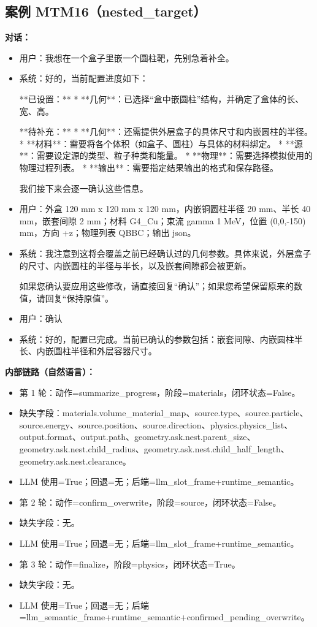 \documentclass[11pt]{ctexart}
\begin{document}
\subsection{案例 MTM16（nested\_target）}
\textbf{对话：}
\begin{itemize}
\item 用户：我想在一个盒子里嵌一个圆柱靶，先别急着补全。
\item 系统：好的，当前配置进度如下：

**已设置：**
*   **几何**：已选择“盒中嵌圆柱”结构，并确定了盒体的长、宽、高。

**待补充：**
*   **几何**：还需提供外层盒子的具体尺寸和内嵌圆柱的半径。
*   **材料**：需要将各个体积（如盒子、圆柱）与具体的材料绑定。
*   **源**：需要设定源的类型、粒子种类和能量。
*   **物理**：需要选择模拟使用的物理过程列表。
*   **输出**：需要指定结果输出的格式和保存路径。

我们接下来会逐一确认这些信息。
\item 用户：外盒 120 mm x 120 mm x 120 mm，内嵌铜圆柱半径 20 mm、半长 40 mm，嵌套间隙 2 mm；材料 G4\_Cu；束流 gamma 1 MeV，位置 (0,0,-150) mm，方向 +z；物理列表 QBBC；输出 json。
\item 系统：我注意到这将会覆盖之前已经确认过的几何参数。具体来说，外层盒子的尺寸、内嵌圆柱的半径与半长，以及嵌套间隙都会被更新。

如果您确认要应用这些修改，请直接回复“确认”；如果您希望保留原来的数值，请回复“保持原值”。
\item 用户：确认
\item 系统：好的，配置已完成。当前已确认的参数包括：嵌套间隙、内嵌圆柱半长、内嵌圆柱半径和外层容器尺寸。
\end{itemize}
\textbf{内部链路（自然语言）：}
\begin{itemize}
\item 第 1 轮：动作=summarize\_progress，阶段=materials，闭环状态=False。
\item 缺失字段：materials.volume\_material\_map、source.type、source.particle、source.energy、source.position、source.direction、physics.physics\_list、output.format、output.path、geometry.ask.nest.parent\_size、geometry.ask.nest.child\_radius、geometry.ask.nest.child\_half\_length、geometry.ask.nest.clearance。
\item LLM 使用=True；回退=无；后端=llm\_slot\_frame+runtime\_semantic。
\item 第 2 轮：动作=confirm\_overwrite，阶段=source，闭环状态=False。
\item 缺失字段：无。
\item LLM 使用=True；回退=无；后端=llm\_slot\_frame+runtime\_semantic。
\item 第 3 轮：动作=finalize，阶段=physics，闭环状态=True。
\item 缺失字段：无。
\item LLM 使用=True；回退=无；后端=llm\_semantic\_frame+runtime\_semantic+confirmed\_pending\_overwrite。
\end{itemize}
\end{document}
